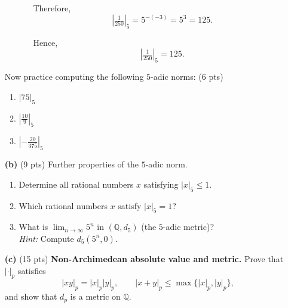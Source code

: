 \begin{problem}
\begin{enumerate}
\begin{itemize}
\begin{enumerate}
Therefore,
\[
\left|\tfrac{1}{250}\right|_5 
= 5^{-(-3)} 
= 5^3 
= 125.
\]

Hence,
\[
\boxed{\;\;\left|\tfrac{1}{250}\right|_5 = 125.\;\;}
\]
\end{enumerate}
\end{itemize}

\medskip

Now practice computing the following $5$-adic norms:
 (6 pts) 
\begin{enumerate}
\item $|75|_5$
\item $\left|\tfrac{10}{9}\right|_5$
\item $\left|-\tfrac{20}{375}\right|_5$
\end{enumerate}

\medskip

\item[\textbf{(b)}]  (9 pts)  Further properties of the $5$-adic norm.
\begin{enumerate}
\item Determine all rational numbers $x$ satisfying $|x|_5\le 1$. 
\item Which rational numbers $x$ satisfy $|x|_5=1$?
\item What is $\lim_{n \to \infty} 5^n$ in $(\mathbb{Q}, d_5)$ (the $5$-adic metric)? \\
\emph{Hint:} Compute $d_5(5^n,0)$.
\end{enumerate}

\medskip

\item[\textbf{(c)}] (15 pts) \textbf{Non-Archimedean absolute value and metric.}  
Prove that $|\cdot|_p$ satisfies
\[
|xy|_p=|x|_p|y|_p,\qquad |x+y|_p\le \max\{|x|_p,|y|_p\},
\]
and show that $d_p$ is a metric on $\mathbb{Q}$.

\end{enumerate}
\end{problem}
